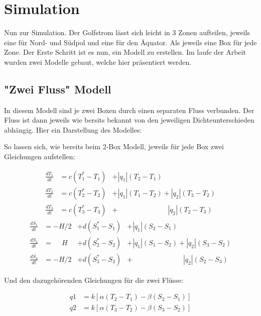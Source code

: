 \section{Simulation}

Nun zur Simulation. Der Golfstrom lässt sich leicht in 3 Zonen aufteilen, jeweils eine für Nord- und Südpol und eine für den Äquator.
Als jeweils eine Box für jede Zone.
Der Erste Schritt ist es nun, ein Modell zu erstellen. 
Im laufe der Arbeit wurden zwei Modelle gebaut, welche hier präsentiert werden.

\subsection{"Zwei Fluss" Modell}

In diesem Modell sind je zwei Boxen durch einen separaten Fluss verbunden. Der Fluss ist dann jeweils wie bersits bekannt von den jeweiligen Dichteunterschieden abhängig. Hier ein Darstellung des Modelles:


So lassen sich, wie bereits beim 2-Box Modell, jeweils für jede Box zwei Gleichungen aufstellen:

\begin{equation}
\begin{aligned}
\frac{dT_1}{dt} &= c(T_1^*-T_1)&+|q_1|(T_2-T_1)\phantom{+|q_2|(T_3-T_2)}
\\
\frac{dT_2}{dt} &= c(T_2^*-T_2)&+|q_1|(T_1-T_2)+|q_2|(T_3-T_2)
\\
\frac{dT_3}{dt} &= c(T_3^*-T_3)&+ \phantom{+|q_1|(T_1-T_2)}|q_2|(T_2-T_3)
\end{aligned}
\end{equation}
\begin{equation}
\begin{aligned}
\frac{dS_1}{dt} &= -H/2 &+ d(S_1^*-S_1)&+|q_1|(S_2-S_1)\phantom{+|q_2|(S_3-S_2)}
\\
\frac{dS_2}{dt} &= \phantom{-}H &+ d(S_2^*-S_2)&+|q_1|(S_1-S_2)+|q_2|(S_3-S_2)	
\\
\frac{dS_3}{dt} &= -H/2 &+d(S_3^*-S_3)&+ \phantom{+|q_1|(S_1-S_2)}|q_2|(S_2-S_3)
\end{aligned}
\end{equation}	

Und den dazugehörenden Gleichungen für die zwei Flüsse:

\begin{equation}
\begin{aligned}
 q1 &= k[\alpha(T_2-T_1)-\beta(S_2-S_1)] 
 \\
 q2 &= k[\alpha(T_3-T_2)-\beta(S_3-S_2)]
\end{aligned}
\end{equation}

